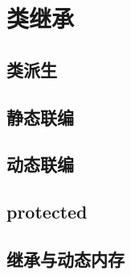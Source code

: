 \chapter{类继承}
\newpage
\section{类派生}
\section{静态联编}
\section{动态联编}
\section{protected}
\section{继承与动态内存}
\newpage